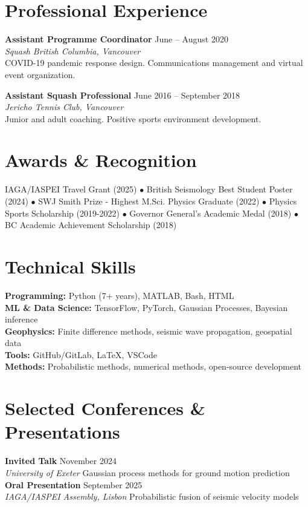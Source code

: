\documentclass[11pt,a4paper]{article}
\newcommand{\cventry}[4]{%
    \noindent\textbf{#1} \hfill #2\\
    \textit{#3} \hfill #4\\[0.3em]
}
\begin{document}
\section*{Professional Experience}
\cventry{Assistant Programme Coordinator}{June -- August 2020}{Squash British Columbia, Vancouver}{}
COVID-19 pandemic response design. Communications management and virtual event organization.

\cventry{Assistant Squash Professional}{June 2016 -- September 2018}{Jericho Tennis Club, Vancouver}{}
Junior and adult coaching. Positive sports environment development.

\section*{Awards \& Recognition}
IAGA/IASPEI Travel Grant (2025) $\bullet$ British Seismology Best Student Poster (2024) $\bullet$ SWJ Smith Prize - Highest M.Sci. Physics Graduate (2022) $\bullet$ Physics Sports Scholarship (2019-2022) $\bullet$ Governor General's Academic Medal (2018) $\bullet$ BC Academic Achievement Scholarship (2018)

\section*{Technical Skills}
\textbf{Programming:} Python (7+ years), MATLAB, Bash, HTML \\
\textbf{ML \& Data Science:} TensorFlow, PyTorch, Gaussian Processes, Bayesian inference \\
\textbf{Geophysics:} Finite difference methods, seismic wave propagation, geospatial data \\
\textbf{Tools:} GitHub/GitLab, LaTeX, VSCode \\
\textbf{Methods:} Probabilistic methods, numerical methods, open-source development

\section*{Selected Conferences \& Presentations}
\cventry{Invited Talk}{November 2024}{University of Exeter}{Gaussian process methods for ground motion prediction}

\cventry{Oral Presentation}{September 2025}{IAGA/IASPEI Assembly, Lisbon}{Probabilistic fusion of seismic velocity models}
\end{document}
